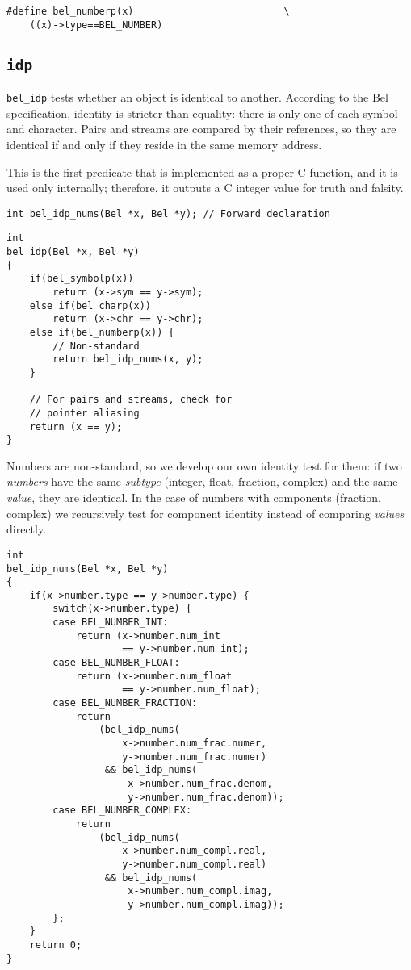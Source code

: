 \documentclass[openright,a4paper,twoside,12pt]{memoir}
\begin{document}
\begin{verbatim}
#define bel_numberp(x)                          \
    ((x)->type==BEL_NUMBER)
\end{verbatim}

\subsection{\texttt{idp}}
\label{sec:org8f53d3d}

\texttt{bel\_idp} tests whether an object is identical to another.
According to the Bel specification, identity is stricter than
equality: there is only one of each symbol and character. Pairs and
streams are compared by their references, so they are identical if and
only if they reside in the same memory address.

This is the first predicate that is implemented as a proper C
function, and it is used only internally; therefore, it outputs a C
integer value for truth and falsity.

\begin{verbatim}
int bel_idp_nums(Bel *x, Bel *y); // Forward declaration
\end{verbatim}

\begin{verbatim}
int
bel_idp(Bel *x, Bel *y)
{
    if(bel_symbolp(x))
        return (x->sym == y->sym);
    else if(bel_charp(x))
        return (x->chr == y->chr);
    else if(bel_numberp(x)) {
        // Non-standard
        return bel_idp_nums(x, y);
    }

    // For pairs and streams, check for
    // pointer aliasing
    return (x == y);
}
\end{verbatim}

Numbers are non-standard, so we develop our own identity test for
them: if two \emph{numbers} have the same \emph{subtype} (integer, float, fraction,
complex) and the same \emph{value}, they are identical. In the case of
numbers with components (fraction, complex) we recursively test for
component identity instead of comparing \emph{values} directly.

\begin{verbatim}
int
bel_idp_nums(Bel *x, Bel *y)
{
    if(x->number.type == y->number.type) {
        switch(x->number.type) {
        case BEL_NUMBER_INT:
            return (x->number.num_int
                    == y->number.num_int);
        case BEL_NUMBER_FLOAT:
            return (x->number.num_float
                    == y->number.num_float);
        case BEL_NUMBER_FRACTION:
            return
                (bel_idp_nums(
                    x->number.num_frac.numer,
                    y->number.num_frac.numer)
                 && bel_idp_nums(
                     x->number.num_frac.denom,
                     y->number.num_frac.denom));
        case BEL_NUMBER_COMPLEX:
            return
                (bel_idp_nums(
                    x->number.num_compl.real,
                    y->number.num_compl.real)
                 && bel_idp_nums(
                     x->number.num_compl.imag,
                     y->number.num_compl.imag));
        };
    }
    return 0;
}
\end{verbatim}
\end{document}
